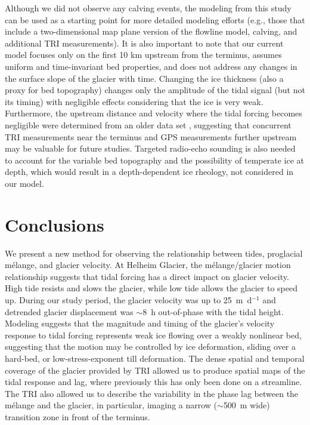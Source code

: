 \documentclass[review]{igs}
\begin{document}
Although we did not observe any calving events, the modeling from this study can be used as a starting point for more detailed modeling efforts (e.g., those that include a two-dimensional map plane version of the flowline model, calving, and additional TRI measurements). It is also important to note that our current model focuses only on the first 10 km upstream from the terminus, assumes uniform and time-invariant bed properties, and does not address any changes in the surface slope of the glacier with time.  Changing the ice thickness (also a proxy for bed topography) changes only the amplitude of the tidal signal (but not its timing) with negligible effects considering that the ice is very weak. Furthermore, the upstream distance and velocity where the tidal forcing becomes negligible were determined from an older data set \citep{verger2011tidewater}, suggesting that concurrent TRI measurements near the terminus and GPS measurements further upstream may be valuable for future studies. Targeted radio-echo sounding is also needed to account for the variable bed topography and the possibility of temperate ice at depth, which would result in a depth-dependent ice rheology, not considered in our model.



\section{Conclusions}
We present a new method for observing the relationship between tides, proglacial m\'elange, and glacier velocity. At Helheim Glacier, the m\'elange/glacier motion relationship suggests that tidal forcing has a direct impact on glacier velocity. High tide resists and slows the glacier, while low tide allows the glacier to speed up. During our study period, the glacier velocity was up to 25~m~d$^{-1}$ and detrended glacier displacement was $\sim$8~h out-of-phase with the tidal height.  Modeling suggests that the magnitude and timing of the glacier's velocity response to tidal forcing represents weak ice flowing over a weakly nonlinear bed, suggesting that the motion may be controlled by ice deformation, sliding over a hard-bed, or low-stress-exponent till deformation. The dense spatial and temporal coverage of the glacier provided by TRI allowed us to produce spatial maps of the tidal response and lag, where previously this has only been done on a streamline. The TRI also allowed us to describe the variability in the phase lag between the m\'elange and the glacier, in particular, imaging a narrow ($\sim$500~m wide) transition zone in front of the terminus.
\end{document}
